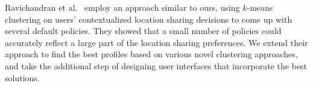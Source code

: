 Ravichandran et al.~\cite{ravichandran2009capturing} employ an approach similar to ours, using $k$-means clustering on users' contextualized location sharing decisions to come up with several default policies. They showed that a small number of policies could accurately reflect a large part of the location sharing preferences. We extend their approach to find the best profiles based on various novel clustering approaches, and take the additional step of designing user interfaces that incorporate the best solutions.

%
%
%


